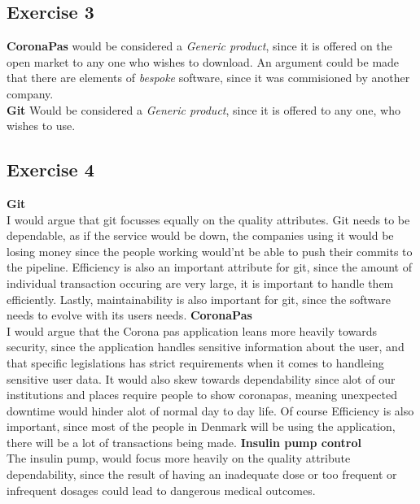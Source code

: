 \documentclass{article}
\begin{document}
\subsection*{Exercise 3} 
\textbf{CoronaPas} would be considered a \textit{Generic product}, since it is offered on the open market to any one who wishes to download. An argument could be made that there are elements of \textit{bespoke} software, since it was commisioned by another company.
\\
\textbf{Git} Would be considered a \textit{Generic product}, since it is offered to any one, who wishes to use.
\subsection*{Exercise 4}
\textbf{Git} \\
I would argue that git focusses equally on the quality attributes. Git needs to be dependable, as if the service would be down, the companies using it would be losing money since the people working would'nt be able to push their commits to the pipeline. 
Efficiency is also an important attribute for git, since the amount of individual transaction occuring are very large, it is important to handle them efficiently.
Lastly, maintainability is also important for git, since the software needs to evolve with its users needs.
\textbf{CoronaPas} \\
I would argue that the Corona pas application leans more heavily towards security, since the application handles sensitive information about the user, and that specific legislations has strict requirements when it comes to handleing sensitive user data.
It would also skew towards dependability since alot of our institutions and places require people to show coronapas, meaning unexpected downtime would hinder alot of normal day to day life.
Of course Efficiency is also important, since most of the people in Denmark will be using the application, there will be a lot of transactions being made.
\textbf{Insulin pump control} \\
The insulin pump, would focus more heavily on the quality attribute dependability, since the result of having an inadequate dose or too frequent or infrequent dosages could lead to dangerous medical outcomes.
\end{document}
